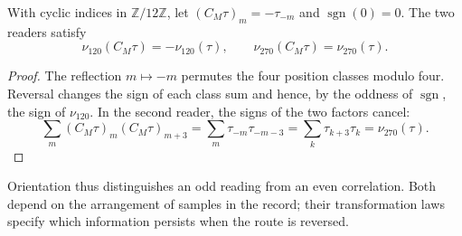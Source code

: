 \begin{proposition}
With cyclic indices in \(\mathbb Z/12\mathbb Z\), let
\((C_M\tau)_m=-\tau_{-m}\) and \(\operatorname{sgn}(0)=0\).
The two readers satisfy
\[
 \nu_{120}(C_M\tau)=-\nu_{120}(\tau),\qquad
 \nu_{270}(C_M\tau)=\nu_{270}(\tau).
\]
\end{proposition}
\begin{proof}
The reflection \(m\mapsto-m\) permutes the four position classes
modulo four. Reversal changes the sign of each class sum and hence,
by the oddness of \(\operatorname{sgn}\), the sign of \(\nu_{120}\).
In the second reader, the signs of the two factors cancel:
\[
 \sum_m(C_M\tau)_m(C_M\tau)_{m+3}
 =\sum_m\tau_{-m}\tau_{-m-3}
 =\sum_k\tau_{k+3}\tau_k
 =\nu_{270}(\tau).
\]
\end{proof}
Orientation thus distinguishes an odd reading from an even correlation.
Both depend on the arrangement of samples in the record; their
transformation laws specify which information persists when the route
is reversed.
